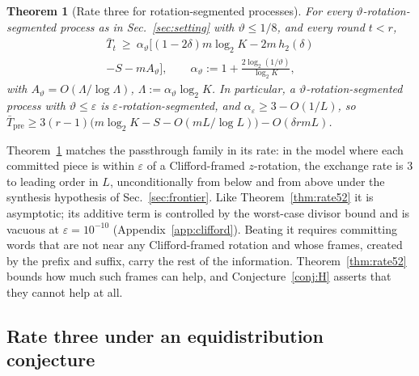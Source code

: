 \documentclass[aps,prx,twocolumn,superscriptaddress,nofootinbib,longbibliography]{revtex4-2}
\theoremstyle{plain}
\newtheorem{theorem}{Theorem}
\theoremstyle{definition}
\theoremstyle{remark}
\newcommand{\Tpre}{T_{\mathrm{pre}}}
\begin{document}
\begin{theorem}[Rate three for rotation-segmented processes]\label{thm:rate3seg}
For every $\vartheta$-rotation-segmented process as in Sec.~\ref{sec:setting} with $\vartheta\le1/8$, and every round $t<r$,
\begin{multline}\label{eq:rate3seg}
\bar T_t\ \ge\ \alpha_\vartheta\big[(1-2\delta)m\log_2K-2m\,h_2(\delta)\\-S-mA_\vartheta\big],\qquad\alpha_\vartheta:=1+\frac{2\log_2(1/\vartheta)}{\log_2K},
\end{multline}
with $A_\vartheta=O(\Lambda/\log\Lambda)$, $\Lambda:=\alpha_\vartheta\log_2K$. In particular, a $\vartheta$-rotation-segmented process with $\vartheta\le\varepsilon$ is $\varepsilon$-rotation-segmented, and $\alpha_\varepsilon\ge3-O(1/L)$, so $\bar\Tpre\ge3(r-1)\big(m\log_2K-S-O(mL/\log L)\big)-O(\delta rmL)$.
\end{theorem}
Theorem~\ref{thm:rate3seg} matches the passthrough family in its rate: in the model where each committed piece is within $\varepsilon$ of a Clifford-framed $z$-rotation, the exchange rate is $3$ to leading order in $L$, unconditionally from below and from above under the synthesis hypothesis of Sec.~\ref{sec:frontier}. Like Theorem~\ref{thm:rate52} it is asymptotic; its additive term is controlled by the worst-case divisor bound and is vacuous at $\varepsilon=10^{-10}$ (Appendix~\ref{app:clifford}). Beating it requires committing words that are not near any Clifford-framed rotation and whose frames, created by the prefix and suffix, carry the rest of the information. Theorem~\ref{thm:rate52} bounds how much such frames can help, and Conjecture~\ref{conj:H} asserts that they cannot help at all.

\subsection{Rate three under an equidistribution conjecture}\label{sec:conj}
\end{document}
